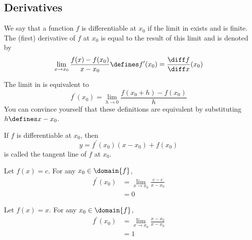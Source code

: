 \subsection{Derivatives}\label{subsec-derivatives}

\begin{definition}\label{def-differentiable}
	We say that a function $f$ is differentiable at $x_0$ if the limit in
	 exists and is finite. The (first) derivative
	of $f$ at $x_0$ is equal to the result of this limit and is denoted by
	\begin{equation}\label{eq-differentiable}
		\lim_{x \to x_0}\frac{f(x)-f(x_0)}{x-x_0} \defines f^\prime(x_0) = \frac{\diff f}{\diff x}(x_0)
	\end{equation}
\end{definition}

\begin{rem}\label{rem-differentiable}
	The limit in  is equivalent to
	\begin{equation}\label{eq-differentiable-alt}
		f^\prime(x_0)=\lim_{h \to 0}\frac{f(x_0+h)-f(x_0)}{h}
	\end{equation}
	You can convince yourself that these definitions are equivalent by substituting
	$h\defines x-x_0$.
\end{rem}

\begin{definition}
	If $f$ is differentiable at $x_0$, then
	\begin{equation}
		y = f^\prime(x_0)(x-x_0)+f(x_0)
	\end{equation}
	is called the tangent line of $f$ at $x_0$.
\end{definition}

\begin{exm}\label{exm-derivatives:1}
	Let $f(x)=c$. For any $x_0\in\domain{f}$,
	\begin{align*}
		f^\prime(x_0) & = \lim_{x \to x_0}\frac{c-c}{x-x_0} \\
		              & = 0
	\end{align*}
\end{exm}

\begin{exm}\label{exm-derivatives:2}
	Let $f(x)=x$. For any $x_0\in\domain{f}$,
	\begin{align*}
		f^\prime(x_0) & = \lim_{x \to x_0}\frac{x-x_0}{x-x_0} \\
		              & = 1
	\end{align*}
\end{exm}

